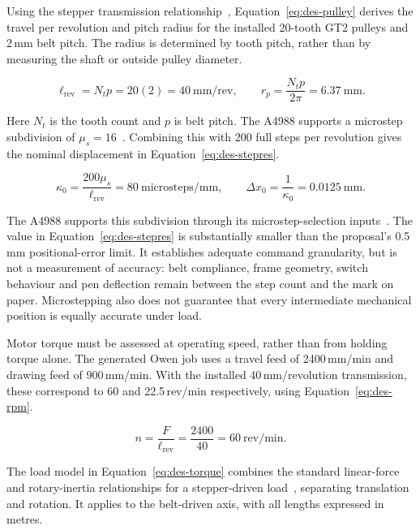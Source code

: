Using the stepper transmission relationship~\cite{acarnley2002}, Equation~\ref{eq:des-pulley} derives the travel per revolution and pitch radius for the installed 20-tooth GT2 pulleys and 2\,mm belt pitch. The radius is determined by tooth pitch, rather than by measuring the shaft or outside pulley diameter.

\begin{equation}
\ell_{\mathrm{rev}}=N_t p=20(2)=40\ \mathrm{mm/rev},\qquad
r_p=\frac{N_t p}{2\pi}=6.37\ \mathrm{mm}.
\label{eq:des-pulley}
\end{equation}

Here $N_t$ is the tooth count and $p$ is belt pitch. The A4988 supports a microstep subdivision of $\mu_s=16$~\cite[p.~6]{a4988ds}. Combining this with 200 full steps per revolution gives the nominal displacement in Equation~\ref{eq:des-stepres}.

\begin{equation}
\kappa_0=\frac{200\mu_s}{\ell_{\mathrm{rev}}}=80\ \mathrm{microsteps/mm},\qquad
\Delta x_0=\frac{1}{\kappa_0}=0.0125\ \mathrm{mm}.
\label{eq:des-stepres}
\end{equation}

The A4988 supports this subdivision through its microstep-selection inputs~\cite[p.~6]{a4988ds}. The value in Equation~\ref{eq:des-stepres} is substantially smaller than the proposal's 0.5\,mm positional-error limit. It establishes adequate command granularity, but is not a measurement of accuracy: belt compliance, frame geometry, switch behaviour and pen deflection remain between the step count and the mark on paper. Microstepping also does not guarantee that every intermediate mechanical position is equally accurate under load.

Motor torque must be assessed at operating speed, rather than from holding torque alone. The generated Owen job uses a travel feed of 2400\,mm/min and drawing feed of 900\,mm/min. With the installed 40\,mm/revolution transmission, these correspond to 60 and 22.5\,rev/min respectively, using Equation~\ref{eq:des-rpm}.

\begin{equation}
n=\frac{F}{\ell_{\mathrm{rev}}}=\frac{2400}{40}=60\ \mathrm{rev/min}.
\label{eq:des-rpm}
\end{equation}

The load model in Equation~\ref{eq:des-torque} combines the standard linear-force and rotary-inertia relationships for a stepper-driven load~\cite{acarnley2002}, separating translation and rotation. It applies to the belt-driven axis, with all lengths expressed in metres.

